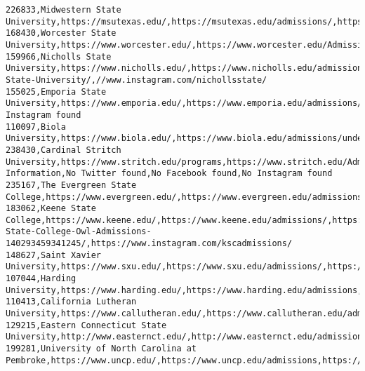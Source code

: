 \documentclass[11pt]{article}
\begin{document}
\begin{Verbatim}[commandchars=\\\{\}]
226833,Midwestern State University,https://msutexas.edu/,https://msutexas.edu/admissions/,https://www.twitter.com/msutexas,https://www.facebook.com/msutexas,https://www.instagram.com/msutexas
168430,Worcester State University,https://www.worcester.edu/,https://www.worcester.edu/Admissions/,https://twitter.com/worcesterstate,https://www.facebook.com/WorcesterStateUniversity,https://www.instagram.com/worcesterstate
159966,Nicholls State University,https://www.nicholls.edu/,https://www.nicholls.edu/admission/,//twitter.com/nichollsstate/,//www.facebook.com/Nicholls-State-University/,//www.instagram.com/nichollsstate/
155025,Emporia State University,https://www.emporia.edu/,https://www.emporia.edu/admissions/,http://twitter.com/emporiastate/,https://www.facebook.com/emporiastateuniversity,No Instagram found
110097,Biola University,https://www.biola.edu/,https://www.biola.edu/admissions/undergrad,https://twitter.com/biolau,https://www.facebook.com/Biola,https://instagram.com/biolauniversity
238430,Cardinal Stritch University,https://www.stritch.edu/programs,https://www.stritch.edu/Admissions/Request-Information,No Twitter found,No Facebook found,No Instagram found
235167,The Evergreen State College,https://www.evergreen.edu/,https://www.evergreen.edu/admissions,https://twitter.com/EvergreenStCol,https://facebook.com/TheEvergreenStateCollege,https://instagram.com/EvergreenStCol
183062,Keene State College,https://www.keene.edu/,https://www.keene.edu/admissions/,https://twitter.com/kscadmissions,https://www.facebook.com/Keene-State-College-Owl-Admissions-140293459341245/,https://www.instagram.com/kscadmissions/
148627,Saint Xavier University,https://www.sxu.edu/,https://www.sxu.edu/admissions/,https://twitter.com/SaintXavier,https://www.facebook.com/SXUCougarDiaries,https://instagram.com/sxucougars
107044,Harding University,https://www.harding.edu/,https://www.harding.edu/admissions,https://twitter.com/HardingU,//www.facebook.com/HardingU,//www.instagram.com/hardinguniversity
110413,California Lutheran University,https://www.callutheran.edu/,https://www.callutheran.edu/admission/undergraduate/,http://www.twitter.com/callutheran,http://www.facebook.com/callutheran,http://www.instagram.com/callutheran
129215,Eastern Connecticut State University,http://www.easternct.edu/,http://www.easternct.edu/admissions/,https://twitter.com/EasternCTStateU,https://www.facebook.com/EasternCTStateUniversity/,https://www.instagram.com/easternctstateuniv/
199281,University of North Carolina at Pembroke,https://www.uncp.edu/,https://www.uncp.edu/admissions,https://twitter.com/uncpembroke,https://www.facebook.com/uncpembroke,https://instagram.com/uncpembroke/

\end{Verbatim}
\end{document}
